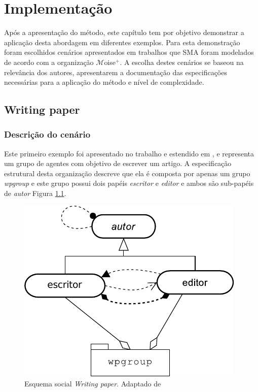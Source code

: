 \chapter{Implementação}

Após a apresentação do método, este capítulo tem por objetivo demonstrar a aplicação desta abordagem em diferentes exemplos. Para esta demonstração foram escolhidos cenários apresentados em trabalhos que SMA foram modelados de acordo com a organização $\mathcal{M}$oise$^{+}$. A escolha destes cenários se baseou na relevância dos autores, apresentarem a documentação das especificações necessárias para a aplicação do método e nível de complexidade.

\section{Writing paper}

\subsection{Descrição do cenário}

Este primeiro exemplo foi apresentado no trabalho \cite{kitio2008organisational} e estendido em \cite{hubner2011normative}, e representa um grupo de agentes com objetivo de escrever um artigo. A especificação estrutural desta organização descreve que ela é composta por apenas um grupo \textit{wpgroup} e este grupo possui dois papéis \textit{escritor} e \textit{editor} e ambos são sub-papéis de \textit{autor} Figura \ref{fig:writing-paper-estrutural}.
    
\begin{figure}[ht]
\centering
\includegraphics[scale=0.7]{imagens/5-writing-paper-estrutural.pdf}
\caption{Esquema social \textit{Writing paper}. Adaptado de \cite{hubner2011normative}}
\label{fig:writing-paper-estrutural}
\end{figure}
    
